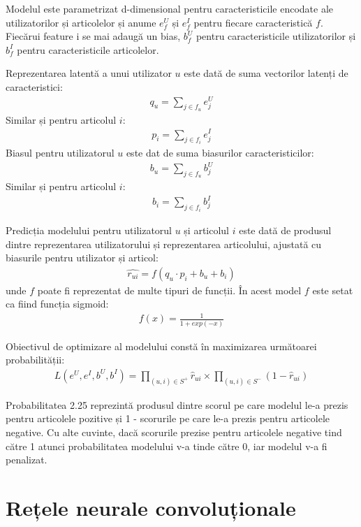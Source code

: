 Modelul este parametrizat d-dimensional pentru caracteristicile encodate ale utilizatorilor și articolelor și anume $e_f^U$ și $e_f^I$ pentru fiecare caracteristică $f$. Fiecărui feature i se mai adaugă un bias, $b_f^U$ pentru caracteristicile utilizatorilor și $b_f^I$ pentru caracteristicile articolelor.

Reprezentarea latentă a unui utilizator $u$ este dată de suma vectorilor latenți de caracteristici:
\begin{align}
	q_u = \sum_{j \in f_u} e_j^U
\end{align}
Similar și pentru articolul $i$:
\begin{align}
	p_i = \sum_{j \in f_i} e_j^I
\end{align}
Biasul pentru utilizatorul $u$ este dat de suma biasurilor caracteristicilor:
\begin{align}
	b_u = \sum_{j \in f_u} b_j^U
\end{align}
Similar și pentru articolul $i$:
\begin{align}
	b_i = \sum_{j \in f_i} b_j^I
\end{align}

Predicția modelului pentru utilizatorul $u$ și articolul $i$ este dată de produsul dintre reprezentarea utilizatorului și reprezentarea articolului, ajustată cu biasurile pentru utilizator și articol:
\begin{align}
	\hat{r_{ui}} = f(q_u \cdot p_i + b_u + b_i)
\end{align}
unde $f$ poate fi reprezentat de multe tipuri de funcții. În acest model $f$ este setat ca fiind funcția sigmoid:
\begin{align}
	f(x) = \frac{1}{1 + exp(-x)}
\end{align}

Obiectivul de optimizare al modelului constă în maximizarea următoarei probabilității:
\begin{align}
	L(e^U, e^I, b^U, b^I) = \prod_{(u,i) \in S^+} \hat{r}_{ui} \times \prod_{(u,i) \in S^-} (1 -\hat{r}_{ui})
\end{align}

Probabilitatea 2.25 reprezintă produsul dintre scorul pe care modelul le-a prezis pentru articolele pozitive și 1 - scorurile pe care le-a prezis pentru articolele negative. Cu alte cuvinte, dacă scorurile prezise pentru articolele negative tind către 1 atunci probabilitatea modelului v-a tinde către 0, iar modelul v-a fi penalizat.

\section{Rețele neurale convoluționale}

